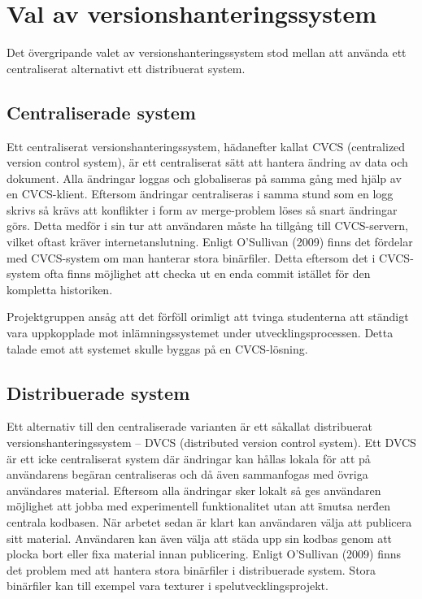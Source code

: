 \section{Val av versionshanteringssystem}

Det övergripande valet av versionshanteringssystem stod mellan att använda ett centraliserat alternativt ett distribuerat system.

\subsection{Centraliserade system}

Ett centraliserat versionshanteringssystem, hädanefter kallat CVCS (centralized version control system), är ett centraliserat sätt att hantera ändring av data och dokument. Alla ändringar loggas och globaliseras på samma gång med hjälp av en CVCS-klient. Eftersom ändringar centraliseras i samma stund som en logg skrivs så krävs att konflikter i form av merge-problem löses så snart ändringar görs. Detta medför i sin tur att användaren måste ha tillgång till CVCS-servern, vilket oftast kräver internetanslutning.
Enligt O’Sullivan (2009) finns det fördelar med CVCS-system om man hanterar stora binärfiler. Detta eftersom det i CVCS-system ofta finns möjlighet att checka ut en enda commit istället för den kompletta historiken.

Projektgruppen ansåg att det förföll orimligt att tvinga studenterna att ständigt vara uppkopplade mot inlämningssystemet under utvecklingsprocessen. Detta talade emot att systemet skulle byggas på en CVCS-lösning.

\subsection{Distribuerade system}

Ett alternativ till den centraliserade varianten är ett såkallat distribuerat versionshanteringssystem – DVCS (distributed version control system). 
Ett DVCS är ett icke centraliserat system där ändringar kan hållas lokala för att på användarens begäran centraliseras och då även sammanfogas med övriga användares material. Eftersom alla ändringar sker lokalt så ges användaren möjlighet att jobba med experimentell funktionalitet utan att \"smutsa ner\" den centrala kodbasen. När arbetet sedan är klart kan användaren välja att publicera sitt material. Användaren kan även välja att städa upp sin kodbas genom att  plocka bort eller fixa material innan publicering.
Enligt O’Sullivan (2009) finns det problem med att hantera stora binärfiler i distribuerade system. Stora binärfiler kan till exempel vara texturer i spelutvecklingsprojekt. 


